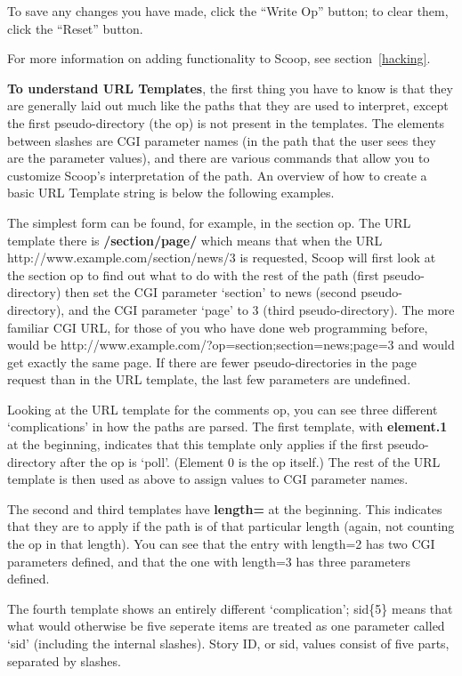 To save any changes you have made, click the ``Write Op'' button; to clear them, click the ``Reset'' button.

For more information on adding functionality to Scoop, see section~\ref{hacking}.

{\bf To understand URL Templates}, the first thing you have to know is that they are generally laid out much like the paths that they are used to interpret, except the first pseudo-directory (the op) is not present in the templates. The elements between slashes are CGI parameter names (in the path that the user sees they are the parameter values), and there are various commands that allow you to customize Scoop's interpretation of the path. An overview of how to create a basic URL Template string is below the following examples.

The simplest form can be found, for example, in the section op. The URL template there is {\bf /section/page/} which means that when the URL http://www.example.com/section/news/3 is requested, Scoop will first look at the section op to find out what to do with the rest of the path (first pseudo-directory) then set the CGI parameter `section' to news (second pseudo-directory), and the CGI parameter `page' to 3 (third pseudo-directory). The more familiar CGI URL, for those of you who have done web programming before, would be http://www.example.com/?op=section;section=news;page=3 and would get exactly the same page. If there are fewer pseudo-directories in the page request than in the URL template, the last few parameters are undefined.

Looking at the URL template for the comments op, you can see three different `complications' in how the paths are parsed. The first template, with {\bf element.1} at the beginning, indicates that this template only applies if the first pseudo-directory after the op is `poll'. (Element 0 is the op itself.) The rest of the URL template is then used as above to assign values to CGI parameter names.

The second and third templates have {\bf length=} at the beginning. This indicates that they are to apply if the path is of that particular length (again, not counting the op in that length). You can see that the entry with length=2 has two CGI parameters defined, and that the one with length=3 has three parameters defined.

The fourth template shows an entirely different `complication'; sid\{5\} means that what would otherwise be five seperate items are treated as one parameter called `sid' (including the internal slashes). Story ID, or sid, values consist of five parts, separated by slashes.

